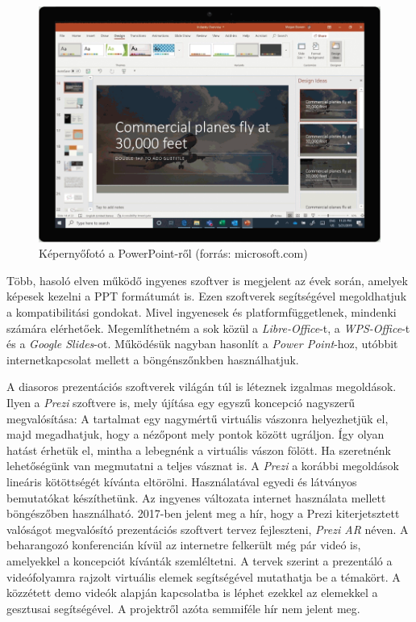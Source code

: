 \begin{figure}[h]
\centering
\includegraphics[width=8.97truecm, height=6.17truecm]{images/PowerPoint.png}
\caption{Képernyőfotó a PowerPoint-ről (forrás: microsoft.com)}
\label{fig:ppt}
\end{figure}

Több, hasoló elven működő ingyenes szoftver is megjelent az évek során, amelyek képesek kezelni a PPT formátumát is. Ezen szoftverek segítségével megoldhatjuk a kompatibilitási gondokat. Mivel ingyenesek és platformfüggetlenek, mindenki számára elérhetőek. Megemlíthetném a sok közül a \textit{Libre-Office}-t, a \textit{WPS-Office}-t és a \textit{Google Slides}-ot. Működésük nagyban hasonlít a \textit{Power Point}-hoz, utóbbit internetkapcsolat mellett a böngénszőnkben használhatjuk.

A diasoros prezentációs szoftverek világán túl is léteznek izgalmas megoldások. 
Ilyen a \textit{Prezi} szoftvere is, mely újítása egy egyszű koncepció nagyszerű megvalósítása: A tartalmat egy nagymértű virtuális vászonra helyezhetjük el, majd megadhatjuk, hogy a nézőpont mely pontok között ugráljon. Így olyan hatást érhetük el, mintha a lebegnénk a virtuális vászon fölött. Ha szeretnénk lehetőségünk van megmutatni a teljes vásznat is. A \textit{Prezi} a korábbi megoldások lineáris kötöttségét kívánta eltörölni. Használatával egyedi és látványos bemutatókat készíthetünk. Az ingyenes változata internet használata mellett böngészőben használható.
2017-ben jelent meg a hír, hogy a Prezi kiterjetsztett valóságot megvalósító prezentációs szoftvert tervez fejleszteni, \textit{Prezi AR} néven. A beharangozó konferencián kívül az internetre felkerült még pár videó is, amelyekkel a koncepciót kívánták szemléltetni. A tervek szerint a prezentáló a videófolyamra rajzolt virtuális elemek segítségével mutathatja be a témakört. A közzétett demo videók alapján kapcsolatba is léphet ezekkel az elemekkel a gesztusai segítségével. A projektről azóta semmiféle hír nem jelent meg.

